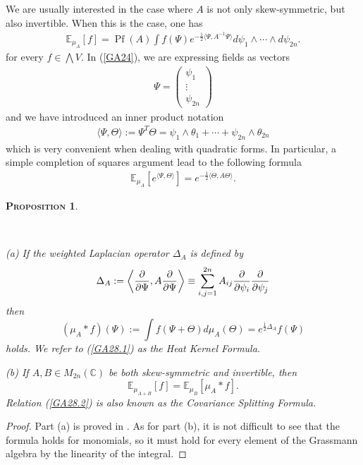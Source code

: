 \documentclass[12pt,twoside]{amsart}
\newcommand{\E}{{\mathbb{E}}}
\newtheorem{prop}{\textsc{Proposition}} [section]
\numberwithin{equation}{section}
\begin{document}
We are usually interested in the case where $A$ is not only skew-symmetric, but also invertible. When this is the case, one has
\begin{eqnarray}
\E_{\mu_{A}}[f] = \operatorname{Pf}(A)\int f(\Psi)e^{-\frac{1}{2}\langle \Psi, A^{-1}\Psi\rangle} d\psi_{1}\wedge \cdots \wedge d\psi_{2n}. \label{GA24}
\end{eqnarray}
for every $f \in \bigwedge V$. In (\ref{GA24}), we are expressing fields as vectors
\begin{eqnarray}
\Psi = \begin{pmatrix}
\psi_{1} \\
\vdots \\
\psi_{2n}
\end{pmatrix}
\label{GA25}
\end{eqnarray}
and we have introduced an inner product notation
\begin{eqnarray}
\langle \Psi, \Theta \rangle := \Psi^{T}\Theta = \psi_{1}\wedge \theta_{1} + \cdots + \psi_{2n}\wedge \theta_{2n} \label{GA26}
\end{eqnarray}
which is very convenient when dealing with quadratic forms. In particular, a simple completion of squares argument lead to the following formula
\begin{eqnarray}
\E_{\mu_{A}}[e^{\langle \Psi,\Theta\rangle}] = e^{-\frac{1}{2}\langle \Theta, A\Theta\rangle}. \label{GA27}
\end{eqnarray}

\begin{prop} \label{propertiesgaussianmeasure}

\

\textup{(a)} If the weighted Laplacian operator $\Delta_{A}$ is defined by
\begin{equation}
\Delta_{A} := \bigg{\langle}\frac{\partial}{\partial \Psi}, A\frac{\partial}{\partial \Psi}\bigg{\rangle} \equiv \sum_{i,j=1}^{2n}A_{ij}\frac{\partial}{\partial \psi_{i}}\frac{\partial}{\partial \psi_{j}}  \label{GA28}
\end{equation}
then
\begin{equation}
(\mu_{A}*f)(\Psi) := \int f(\Psi+\Theta)d\mu_{A}(\Theta) = e^{\frac{1}{2}\Delta_{A}}f(\Psi)  \label{GA28.1}
\end{equation}
holds. We refer to (\ref{GA28.1}) as the Heat Kernel Formula. 

\textup{(b)}  If $A, B \in M_{2n}(\mathbb{C})$ be both skew-symmetric and invertible, then
\begin{equation}
\E_{\mu_{A+B}}[f] = \E_{\mu_{B}}[\mu_{A}*f]. \label{GA28.2}
\end{equation}
Relation (\ref{GA28.2}) is also known as the Covariance Splitting Formula. 

\end{prop}
\begin{proof} Part \textup{(a)} is proved in \cite{FKTbook,MSbook}. As for part \textup{(b)}, it is not difficult to see that the formula holds for monomials, so it must hold for every element of the Grassmann algebra by the linearity of the integral. 
\end{proof}
\end{document}
